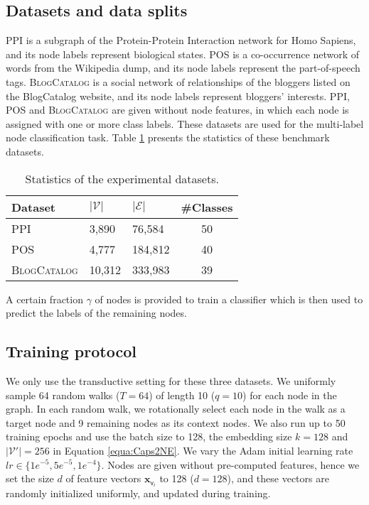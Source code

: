 \documentclass[sigconf]{acmart}
\begin{document}
\subsection{Datasets and data splits}

PPI \citep{BioGRID:2008} is a subgraph of the Protein-Protein Interaction network for Homo Sapiens, and its node labels represent biological states. POS \citep{mahoney2011large} is a co-occurrence network of words from the Wikipedia dump, and its node labels represent the part-of-speech tags. \textsc{BlogCatalog} \citep{ZafaraniLiu:2009} is a social network of relationships of the bloggers listed on the BlogCatalog website, and its node labels represent bloggers' interests.  {PPI, POS} and \textsc{BlogCatalog} are given without node features, in which each node is assigned with one or more class labels. These datasets are used for the multi-label node classification task.
Table \ref{tab:graphdatasets_pos} presents the statistics of these benchmark datasets.

\begin{table}[!ht]
\centering
\caption{Statistics of the experimental datasets.}
\def\arraystretch{1.1}
\begin{tabular}{l|llc}
\hline
\bf Dataset &  \bf{$|\mathcal{V}|$} & \bf{$|\mathcal{E}|$} & {\#Classes}\\
\hline
PPI & 3,890 & 76,584 & 50 \\
POS & 4,777 & 184,812 & 40 \\
\textsc{BlogCatalog} & 10,312 & 333,983 & 39\\
\hline
\end{tabular}
\label{tab:graphdatasets_pos}
\end{table}

A certain fraction $\gamma$ of nodes is provided to train a classifier which is then used to predict the labels of the remaining nodes.

\subsection{Training protocol}

We only use the transductive setting for these three datasets. We uniformly sample 64 random walks ($T = 64$) of length 10 ($q= 10$) for each node in the graph. 
In each random walk, we rotationally select each node in the walk as a target node and 9 remaining nodes as its context nodes.
We also run up to 50 training epochs and use the batch size to 128, the embedding size $k= 128$ and  $|\mathcal{V'}| = 256$ in Equation \ref{equa:Caps2NE}.
We vary the Adam initial learning rate $lr \in \{1e^{-5}, 5e^{-5}, 1e^{-4}\}$. Nodes are given without pre-computed features, hence we set the  size $d$ of feature vectors $\boldsymbol{x}_{\mathsf{v}_i}$ to 128 ($d = 128$), and these vectors are randomly  initialized uniformly, and updated during training.
\end{document}
